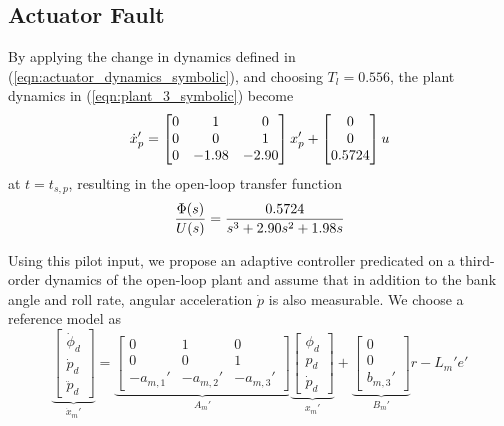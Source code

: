 \subsection{Actuator Fault}
By applying the change in dynamics defined in (\ref{eqn:actuator_dynamics_symbolic}), and choosing $T_l = 0.556$, the plant dynamics in (\ref{eqn:plant_3_symbolic}) become
\begin{equation}
	\dot{x}_p' = \begin{bmatrix}
		0 & \hfil 1 & \hfil 0\\ 0 & \hfil 0 & \hfil 1 \\ 0 & -1.98 & -2.90
	\end{bmatrix} x_p' + \begin{bmatrix}
		0 \\ 0 \\ 0.5724
	\end{bmatrix} u
	\label{eqn:plant_3}
\end{equation}
\noindent at $t = t_{s,p}$, resulting in the open-loop transfer function
\begin{equation}
		\frac{\Phi(s)}{U(s)} = \frac{0.5724}{s^3 + 2.90s^2 + 1.98s}\\
\end{equation}

Using this pilot input, we propose an adaptive controller predicated on a third-order dynamics of the open-loop plant and assume that in addition to the bank angle and roll rate, angular acceleration $\dot{p}$ is also measurable. We choose a reference model as
\begin{equation}
	\underbrace{\begin{bmatrix}
		\dot{\phi}_d \\ \dot{p}_d \\ \ddot{p}_d
	\end{bmatrix}}_{\dot{x}_m'} = \underbrace{\begin{bmatrix}
		0 & 1 & 0\\ 0 & 0 & 1 \\ -a_{m,1}' & -a_{m,2}' & -a_{m,3}'
	\end{bmatrix}}_{A_m'} \underbrace{\begin{bmatrix}
		\phi_d \\ p_d \\ \dot{p}_d
	\end{bmatrix}}_{x_m'} + \underbrace{\begin{bmatrix}
		0 \\ 0 \\ b_{m,3}'
	\end{bmatrix}}_{B_m'} r - L_m' e'
	\label{eqn:rm_3_symbolic}
\end{equation}


